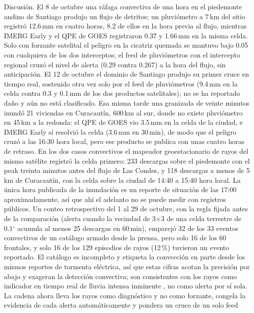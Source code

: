 \documentclass[authoryear,preprint,review,12pt]{elsarticle}
\begin{document}
Discusión. El 8 de octubre una ráfaga convectiva de una hora en el piedemonte
andino de Santiago produjo un flujo de detritos; un pluviómetro a 7\,km del sitio
registró 12.6\,mm en cuatro horas, 8.2 de ellos en la hora previa al flujo,
mientras IMERG Early y el QPE de GOES registraron 0.37 y 1.66\,mm en la misma
celda. Solo con forzante satelital el peligro en la cicatriz quemada se mantuvo
bajo 0.05 con cualquiera de los dos interceptos; el feed de pluviómetros con el
intercepto regional cruzó el nivel de alerta (0.29 contra 0.267) a la hora del
flujo, sin anticipación. El 12 de octubre el dominio de Santiago produjo su primer
cruce en tiempo real, sostenido otra vez solo por el feed de pluviómetros
(9.4\,mm en la celda contra 0.3 y 0.1\,mm de los dos productos satelitales); no se
ha reportado daño y aún no está clasificado. Esa misma tarde una granizada de
veinte minutos inundó 21 viviendas en Curacautín, 600\,km al sur, donde no existe
pluviómetro en 45\,km a la redonda: el QPE de GOES vio 3.5\,mm en la celda de la
ciudad, e IMERG Early sí resolvió la celda (3.6\,mm en 30\,min), de modo que el
peligro cruzó a las 16:30 hora local, pero ese producto se publica con unas
cuatro horas de retraso. En los dos casos convectivos el mapeador geoestacionario
de rayos del mismo satélite \citep{goodman2013} registró la celda primero: 233
descargas sobre el piedemonte con el peak treinta minutos antes del flujo de Las
Condes, y 118 descargas a menos de 5\,km de Curacautín, con la celda sobre la ciudad de
14:40 a 15:40 hora local. La única hora publicada de la inundación es un reporte
de situación de las 17:00 aproximadamente, así que ahí el adelanto no se puede
medir con registros públicos.
Un conteo retrospectivo del 1 al 29 de octubre, con la regla fijada antes de la
comparación (alerta cuando la vecindad de 3$\times$3 de una celda terrestre de
0.1$^\circ$ acumula al menos 25 descargas en 60\,min), emparejó 32 de los 33 eventos
convectivos de un catálogo armado desde la prensa, pero solo 16 de los 60 frontales,
y solo 16 de los 129 episodios de rayos (12\,\%) tuvieron un evento reportado. El
catálogo es incompleto y etiqueta la convección en parte desde los mismos reportes de
tormenta eléctrica, así que estas cifras acotan la precisión por abajo y exageran la
detección convectiva; son consistentes con los rayos como indicador en tiempo real de
lluvia intensa inminente \citep{price2011}, no como alerta por sí sola. La cadena ahora lleva los rayos como diagnóstico y no como forzante,
congela la evidencia de cada alerta automáticamente y pondera un cruce de un solo feed
\end{document}
